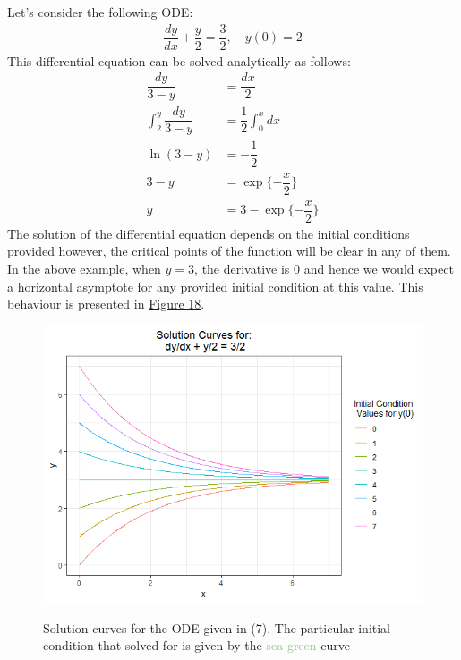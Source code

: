 \documentclass{article}
\begin{document}
\noindent Let's consider the following ODE:
\begin{align}
    \dfrac{dy}{dx} + \dfrac{y}{2} = \dfrac{3}{2}, \hspace{1em} y(0) = 2
\end{align}
\noindent This differential equation can be solved analytically as follows:
\begin{align}
    \dfrac{dy}{3 - y} & = \dfrac{dx}{2}\\
    \int_{2}^{y}\dfrac{dy}{3 - y} & = \dfrac{1}{2}\int_{0}^{x}dx\\
    \ln{(3 - y)} & = -\dfrac{1}{2}\\
    3 - y & = \exp\{-\dfrac{x}{2}\}\\
    y & = 3 - \exp\{-\dfrac{x}{2}\}
\end{align}
\noindent The solution of the differential equation depends on the initial conditions provided however, the critical points of the function will be clear in any of them. In the above example, when $y = 3$, the derivative is 0 and hence we would expect a horizontal asymptote for any provided initial condition at this value. This behaviour is presented in \hyperref[fig:solutionsCurve]{Figure 18}.


\begin{figure}[h!]
  \centering
  \includegraphics[scale = 0.7]{solution_curves.png}
  \label{fig:solutionsCurve}
  \caption{Solution curves for the ODE given in (7). The particular initial condition that solved for is given by the \textcolor{darkseagreen}{sea green} curve}
\end{figure}
\end{document}
